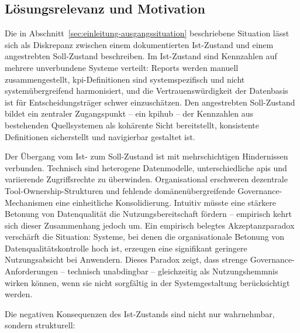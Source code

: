 
\subsection{Lösungsrelevanz und Motivation}
\label{sec:einleitung-relevanz}

Die in Abschnitt~\ref{sec:einleitung-ausgangssituation} beschriebene Situation lässt sich als Diskrepanz zwischen einem dokumentierten Ist-Zustand und einem angestrebten Soll-Zustand beschreiben.
Im Ist-Zustand sind Kennzahlen auf mehrere unverbundene Systeme verteilt: Reports werden manuell zusammengestellt, \gls{kpi}-Definitionen sind systemspezifisch und nicht systemübergreifend harmonisiert, und die Vertrauenswürdigkeit der Datenbasis ist für Entscheidungsträger schwer einzuschätzen.
Den angestrebten Soll-Zustand bildet ein zentraler Zugangspunkt -- ein \gls{kpihub} -- der Kennzahlen aus bestehenden Quellsystemen als kohärente Sicht bereitstellt, konsistente Definitionen sicherstellt und navigierbar gestaltet ist.

Der Übergang vom Ist- zum Soll-Zustand ist mit mehrschichtigen Hindernissen verbunden.
Technisch sind heterogene Datenmodelle, unterschiedliche \glspl{api} und variierende Zugriffsrechte zu überwinden.
Organisational erschweren dezentrale Tool-Ownership-Strukturen und fehlende domänenübergreifende Governance-Mechanismen eine einheitliche Konsolidierung.
Intuitiv müsste eine stärkere Betonung von Datenqualität die Nutzungsbereitschaft fördern -- empirisch kehrt sich dieser Zusammenhang jedoch um.
Ein empirisch belegtes Akzeptanzparadox verschärft die Situation: Systeme, bei denen die organisationale Betonung von Datenqualitätskontrolle hoch ist, erzeugen eine signifikant geringere Nutzungsabsicht bei Anwendern.
Dieses Paradox zeigt, dass strenge Governance-Anforderungen -- technisch unabdingbar -- gleichzeitig als Nutzungshemmnis wirken können, wenn sie nicht sorgfältig in der Systemgestaltung berücksichtigt werden.

Die negativen Konsequenzen des Ist-Zustands sind nicht nur wahrnehmbar, sondern strukturell:

